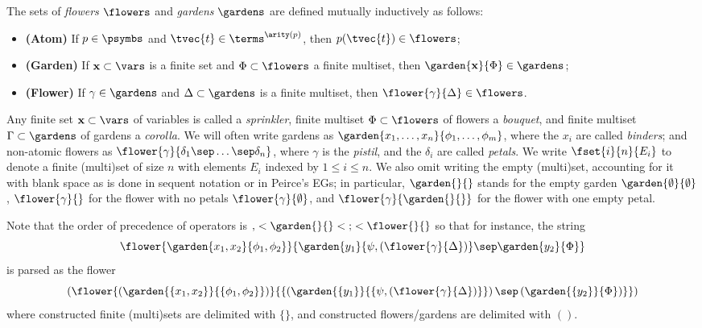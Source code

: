 \begin{definition}[Flowers]\label{def:flowers}
  The sets of \emph{flowers} $\flowers$ and \emph{gardens} $\gardens$ are
  defined mutually inductively as follows:
  \begin{itemize}
    \item{\textbf{(Atom)}} If $p \in \psymbs$ and $\tvec{t} \in
    \terms^{\arity(p)}$, then $p(\tvec{t}) \in \flowers$;
    \item{\textbf{(Garden)}} If $\mathbf{x} \subset \vars$ is a finite set and $\Phi
    \subset \flowers$ a finite multiset, then $\garden{\mathbf{x}}{\Phi} \in
    \gardens$;
    \item{\textbf{(Flower)}} If $\gamma \in \gardens$ and $\Delta \subset \gardens$
    is a finite multiset, then $\flower{\gamma}{\Delta} \in \flowers$.
  \end{itemize}
\end{definition}

Any finite set $\mathbf{x} \subset \vars$ of variables is called a
\emph{sprinkler}, finite multiset $\Phi \subset \flowers$ of flowers a
\emph{bouquet}, and finite multiset $\Gamma \subset \gardens$ of gardens a
\emph{corolla}. We will often write gardens as $\garden{x_1, \ldots,
x_n}{\phi_1, \ldots, \phi_m}$, where the $x_i$ are called \emph{binders}; and
non-atomic flowers as $\flower{\gamma}{\delta_1 \sep \ldots \sep \delta_n}$,
where $\gamma$ is the \emph{pistil}, and the $\delta_i$ are called
\emph{petals}. We write $\fset{i}{n}{E_i}$ to denote a finite (multi)set of
size $n$ with elements $E_i$ indexed by $1 \leq i \leq n$. We also omit
writing the empty (multi)set, accounting for it with blank space as is done in
sequent notation or in Peirce's EGs; in particular, $\garden{{}}{{}}$ stands for
the empty garden $\garden{\emptyset}{\emptyset}$, $\flower{\gamma}{{}}$ for the
flower with no petals $\flower{\gamma}{\emptyset}$, and
$\flower{\gamma}{\garden{{}}{{}}}$ for the flower with one empty petal.

Note that the order of precedence of operators is
$\mathop{,} < \garden{{}}{{}} < \mathop{;} < \mathop{\flower{}{}}$
so that for instance, the string
$$\flower{\garden{x_1, x_2}{\phi_1, \phi_2}}{\garden{y_1}{\psi, (\flower{\gamma}{\Delta})} \sep \garden{y_2}{\Phi}}$$
is parsed as the flower
$$\left(\flower{\left(\garden{\{x_1, x_2\}}{\{\phi_1,
\phi_2\}}\right)}{\{\left(\garden{\{y_1\}}{\{\psi,
\left(\flower{\gamma}{\Delta}\right)\}}\right) \sep
\left(\garden{\{y_2\}}{\Phi}\right)\}}\right)$$ where constructed finite
(multi)sets are delimited with $\{\}$, and constructed flowers/gardens are
delimited with $()$.


